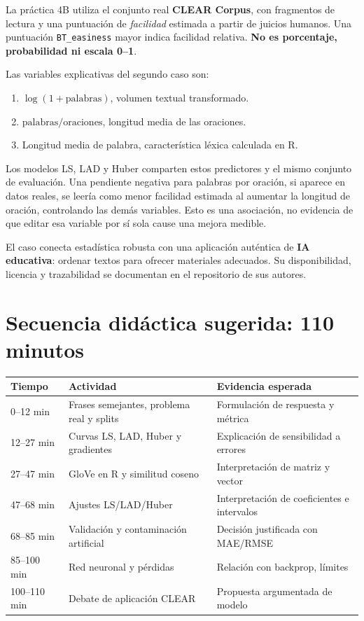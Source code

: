 \documentclass[11pt,a4paper]{article}
\begin{document}
La práctica 4B utiliza el conjunto real \textbf{CLEAR Corpus}, con fragmentos de lectura y una puntuación de \emph{facilidad} estimada a partir de juicios humanos. Una puntuación \texttt{BT\_easiness} mayor indica facilidad relativa. \textbf{No es porcentaje, probabilidad ni escala 0--1}.

Las variables explicativas del segundo caso son:
\begin{enumerate}
 \item \(\log(1+\text{palabras})\), volumen textual transformado.
 \item \(\text{palabras}/\text{oraciones}\), longitud media de las oraciones.
 \item Longitud media de palabra, característica léxica calculada en R.
\end{enumerate}

Los modelos LS, LAD y Huber comparten estos predictores y el mismo conjunto de evaluación. Una pendiente negativa para palabras por oración, si aparece en datos reales, se leería como menor facilidad estimada al aumentar la longitud de oración, controlando las demás variables. Esto es una asociación, no evidencia de que editar esa variable por sí sola cause una mejora medible.

El caso conecta estadística robusta con una aplicación auténtica de \textbf{IA educativa}: ordenar textos para ofrecer materiales adecuados. Su disponibilidad, licencia y trazabilidad se documentan en el repositorio de sus autores.

\section{Secuencia didáctica sugerida: 110 minutos}

\begin{center}
\begin{tabular}{p{.17\linewidth}p{.36\linewidth}p{.39\linewidth}}
\toprule
\textbf{Tiempo} & \textbf{Actividad} & \textbf{Evidencia esperada}\\\midrule
0--12 min & Frases semejantes, problema real y splits & Formulación de respuesta y métrica\\
12--27 min & Curvas LS, LAD, Huber y gradientes & Explicación de sensibilidad a errores\\
27--47 min & GloVe en R y similitud coseno & Interpretación de matriz y vector\\
47--68 min & Ajustes LS/LAD/Huber & Interpretación de coeficientes e intervalos\\
68--85 min & Validación y contaminación artificial & Decisión justificada con MAE/RMSE\\
85--100 min & Red neuronal y pérdidas & Relación con backprop, límites\\
100--110 min & Debate de aplicación CLEAR & Propuesta argumentada de modelo\\
\bottomrule
\end{tabular}
\end{center}
\end{document}
